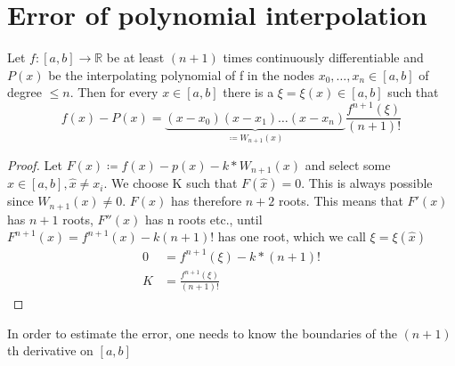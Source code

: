 \section{Error of polynomial interpolation}\label{sec:error-of-polynomial-interpolation}

\begin{theorem}
    Let $f:[a,b] \to \mathbb{R}$ be at least $(n+1)$ times continuously differentiable and $P(x)$ be the interpolating polynomial of f in the nodes
    $x_0, \ldots, x_n \in [a,b]$ of degree $\leq n$.
    Then for every $x \in [a,b]$ there is a $\xi = \xi(x) \in [a,b]$ such that
    \begin{equation*}
        f(x)-P(x) = \underbrace{(x-x_0)(x-x_1)\ldots(x-x_n)}_{\coloneq W_{n+1}(x)}\frac{f^{n+1}(\xi)}{(n+1)!}
    \end{equation*}
\end{theorem}
\begin{proof}
    Let $F(x) \coloneq f(x)-p(x)-k*W_{n+1}(x)$ and select some $\hat{x}\in [a,b], \hat{x} \neq x_i$.
    We choose K such that $F(\hat{x})=0$.
    This is always possible since $W_{n+1}(x) \neq 0$. $F(x)$ has therefore $n+2$ roots.
    This means that $F'(x)$ has $n+1$ roots, $F''(x)$ has n roots etc., until $F^{n+1}(x)= f^{n+1}(x)-k(n+1)!$ has one root,
    which we call $\xi = \xi(\hat{x})$
    \begin{align*}
        0 &= f^{n+1}(\xi)-k*(n+1)! \\
        K &= \frac{f^{n+1}(\xi)}{(n+1)!}
    \end{align*}
\end{proof}
\begin{remark}
    In order to estimate the error, one needs to know the boundaries of the $(n+1)$th derivative on $[a,b]$
\end{remark}


